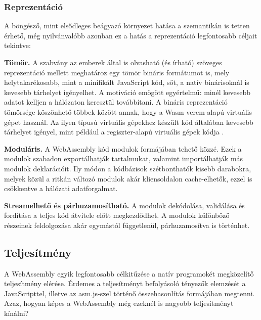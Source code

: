 \subsubsection{Reprezentáció}

A böngésző, mint elsődleges beágyazó környezet hatása a szemantikán is tetten érhető, még nyilvánvalóbb azonban ez a hatás a reprezentáció legfontosabb céljait tekintve:

\begin{outdentlist}
    \item[]\textbf{Tömör.}
    A szabvány az emberek által is olvasható (és írható) szöveges reprezentáció mellett meghatároz egy tömör bináris formátumot is, mely helytakarékosabb, mint a minifikált JavaScript kód, sőt, a natív binárisoknál is kevesebb tárhelyet igényelhet. A motiváció emögött egyértelmű: minél kevesebb adatot kelljen a hálózaton keresztül továbbítani. A bináris reprezentáció tömörsége köszönhető többek között annak, hogy a Wasm verem-alapú virtuális gépet használ. Az ilyen típusú virtuális gépekhez készült kód általában kevesebb tárhelyet igényel, mint például a regiszter-alapú virtuális gépek kódja \cite{Friedman::EssentialsOfProgrammingLanguages}.

    \item[]\textbf{Moduláris.}
    A WebAssembly kód modulok formájában tehető közzé. Ezek a modulok szabadon exportálhatják tartalmukat, valamint importálhatják más modulok deklarációit. Ily módon a kódbázisok szétbonthatók kisebb darabokra, melyek közül a ritkán változó modulok akár kliensoldalon cache-elhetők, ezzel is csökkentve a hálózati adatforgalmat.

    \item[]\textbf{Streamelhető és párhuzamosítható.}
    A modulok dekódolása, validálása és fordítása a teljes kód átvitele előtt megkezdődhet. A modulok különböző részeinek feldolgozása akár egymástól függetlenül, párhuzamosítva is történhet.

\end{outdentlist}

\subsection{Teljesítmény}

A WebAssembly egyik legfontosabb célkitűzése a natív programokét megközelítő teljesítmény elérése. Érdemes a teljesítményt befolyásoló tényezők elemzését a JavaScripttel, illetve az asm.js-szel történő összehasonlítás formájában megtenni. Azaz, hogyan képes a WebAssembly még ezeknél is nagyobb teljesítményt kínálni?

